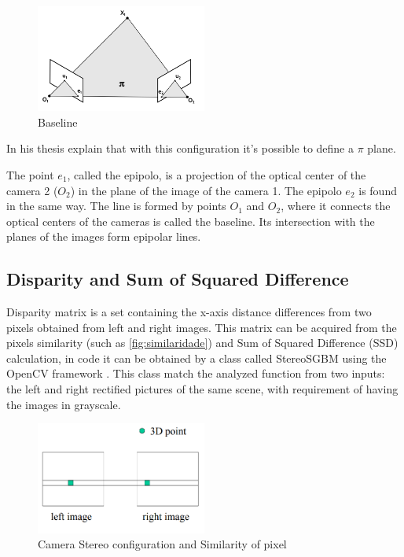     \begin{figure}[H]
     \caption{\label{fig:epipolar03}
Baseline}
     \begin{center}
        \includegraphics[width=0.5\textwidth]{images/epipolar3.png}
     \end{center}
    \end{figure}
    
    In his thesis \cite{geometriaEpipolarLeonardo} explain that with this configuration it's possible to define a \(\pi\) plane.
    
    The point \(e_{1}\), called the epipolo, is a projection of the optical center of the camera 2 (\(O_{2}\)) in the plane of the image of the camera 1. The epipolo \(e_{2}\) is found in the same way. The line is formed by points \(O_{1}\) and \(O_{2}\), where it connects the optical centers of the cameras is called the baseline. Its intersection with the planes of the images form epipolar lines. 
    
\subsection{Disparity and Sum of Squared Difference}

    Disparity matrix is a set containing the x-axis distance differences from two pixels obtained from left and right images. This matrix can be acquired from the pixels similarity (such as \autoref{fig:similaridade}) and Sum of Squared Difference (SSD) calculation, in code it can be obtained by a class called StereoSGBM using the OpenCV framework \cite{openCVCalibration}. This class match the analyzed function from two inputs: the left and right rectified pictures of the same scene, with requirement of having the images in grayscale.
    
    \begin{figure}[H]
     \caption{\label{fig:similaridade}
Camera Stereo configuration and Similarity of pixel}
     \begin{center}
        \includegraphics[width=0.5\textwidth]{images/similaridade.png}
     \end{center}
    \end{figure}
    
